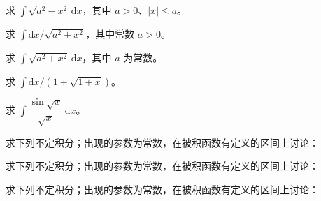 \noindent\begin{minipage}{\textwidth}
求 $\int\sqrt{a^2-x^2}\,\mathrm dx$，其中 $a>0$、$|x|\le a$。
\end{minipage}\par\vfill
\noindent\begin{minipage}{\textwidth}
求 $\int\mathrm dx/\sqrt{a^2+x^2}$，其中常数 $a>0$。
\end{minipage}\par\vfill
\newpage
\noindent\begin{minipage}{\textwidth}
求 $\int\sqrt{a^2+x^2}\,\mathrm dx$，其中 $a$ 为常数。
\end{minipage}\par\vfill
\noindent\begin{minipage}{\textwidth}
求 $\int\mathrm dx/(1+\sqrt{1+x})$。
\end{minipage}\par\vfill
\noindent\begin{minipage}{\textwidth}
求 $\int\dfrac{\sin\sqrt{x}}{\sqrt{x}}\,\mathrm dx$。
\end{minipage}\par\vfill
\newpage
\noindent\begin{minipage}{\textwidth}
求下列不定积分；出现的参数为常数，在被积函数有定义的区间上讨论：
\end{minipage}\par\vfill
\noindent\begin{minipage}{\textwidth}
求下列不定积分；出现的参数为常数，在被积函数有定义的区间上讨论：
\end{minipage}\par\vfill
\noindent\begin{minipage}{\textwidth}
求下列不定积分；出现的参数为常数，在被积函数有定义的区间上讨论：
\end{minipage}\par\vfill
